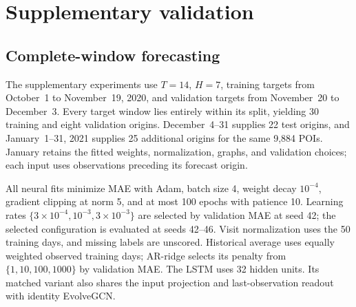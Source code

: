 \documentclass[preprint,authoryear,11pt]{elsarticle}
\theoremstyle{definition}
\begin{document}
\begingroup
{}
\appendix
\setcounter{table}{0}
\section{Supplementary validation}
\label{app:minimal_validation}

\subsection{Complete-window forecasting}
\label{app:minimal_forecasting}

The supplementary experiments use \(T=14\), \(H=7\), training targets from October~1 to November~19, 2020, and validation targets from November~20 to December~3. Every target window lies entirely within its split, yielding 30 training and eight validation origins. December~4--31 supplies 22 test origins, and January~1--31, 2021 supplies 25 additional origins for the same 9,884 POIs. January retains the fitted weights, normalization, graphs, and validation choices; each input uses observations preceding its forecast origin.

All neural fits minimize MAE with Adam, batch size 4, weight decay \(10^{-4}\), gradient clipping at norm 5, and at most 100 epochs with patience 10. Learning rates \(\{3\times10^{-4},10^{-3},3\times10^{-3}\}\) are selected by validation MAE at seed 42; the selected configuration is evaluated at seeds 42--46. Visit normalization uses the 50 training days, and missing labels are unscored. Historical average uses equally weighted observed training days; AR-ridge selects its penalty from \(\{1,10,100,1000\}\) by validation MAE. The LSTM uses 32 hidden units. Its matched variant also shares the input projection and last-observation readout with identity EvolveGCN.
\end{document}
